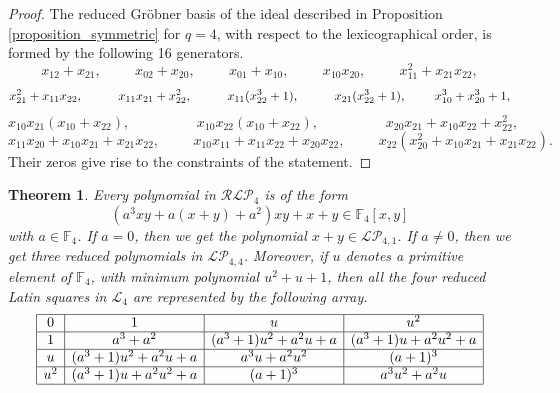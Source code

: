 \documentclass[pdflatex,sn-mathphys-num]{sn-jnl}
\theoremstyle{thmstyleone}%
\newtheorem{theorem}{Theorem}[section]
\begin{document}
\begin{proof} The reduced Gr\"obner basis of the ideal described in Proposition \ref{proposition_symmetric} for $q=4$, with respect to the lexicographical order, is formed by the following 16 generators.
\[x_{12}+x_{21},\hspace{1cm}
x_{02}+x_{20},\hspace{1cm}
x_{01}+x_{10},\hspace{1cm}
x_{10}x_{20},\hspace{1cm}
x_{11}^2+x_{21}x_{22},\]
\[
x_{21}^2+x_{11}x_{22},\hspace{1cm} 
x_{11}x_{21}+x_{22}^2,\hspace{1cm} 
x_{11}(x_{22}^3+1),\hspace{1cm} 
x_{21}(x_{22}^3+1),\hspace{0.8cm} 
x_{10}^3+x_{20}^3+1,\]
\[x_{10}x_{21}(x_{10}+x_{22}),\hspace{2cm} 
x_{10}x_{22}(x_{10}+x_{22}),\hspace{2cm} 
x_{20}x_{21}+x_{10}x_{22}+x_{22}^2,\]
\[x_{11}x_{20}+x_{10}x_{21}+x_{21}x_{22},\hspace{1cm} 
x_{10}x_{11}+x_{11}x_{22}+x_{20}x_{22},\hspace{1cm} 
x_{22}(x_{20}^2+x_{10}x_{21}+x_{21}x_{22}).\]
Their zeros give rise to the constraints of the statement.
\end{proof}

\vspace{0.2cm}

\begin{theorem}\label{theorem_RLP4} Every polynomial in $\mathcal{RLP}_4$ is of the form
\begin{equation}\label{equation_RLP4}
\left(a^3xy+a(x+y)+a^2\right)xy+x+y\in\mathbb{F}_4[x,y]
\end{equation}
with $a\in\mathbb{F}_4$. If $a=0$, then we get the polynomial $x+y\in \mathcal{LP}_{4,1}$. If $a\neq 0$, then we get three reduced polynomials in $\mathcal{LP}_{4,4}$. Moreover, if $u$ denotes a primitive element of $\mathbb{F}_4$, with minimum polynomial $u^2+u+1$, then all the four reduced Latin squares in $\mathcal{L}_4$ are represented by the following array.
\[\begin{array}{|c|c|c|c|} \hline
0 & 1 & u & u^2\\ \hline
1 & a^3+a^2 & (a^3+1)u^2+a^2u+a & (a^3+1)u+a^2u^2+a\\ \hline
u & (a^3+1)u^2+a^2u+a & a^3u+a^2u^2& (a+1)^3\\ \hline
u^2 & (a^3+1)u+a^2u^2+a& (a+1)^3& a^3u^2+a^2u\\ \hline
\end{array}\]
\end{theorem}
\end{document}
